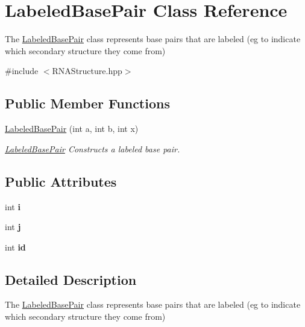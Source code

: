 \hypertarget{class_labeled_base_pair}{}\section{Labeled\+Base\+Pair Class Reference}
\label{class_labeled_base_pair}


The \hyperlink{class_labeled_base_pair}{Labeled\+Base\+Pair} class represents base pairs that are labeled (eg to indicate which secondary structure they come from)  




{\ttfamily \#include $<$R\+N\+A\+Structure.\+hpp$>$}

\subsection*{Public Member Functions}
\begin{DoxyCompactItemize}
\item 
\hyperlink{class_labeled_base_pair_a27c5707963ace24bde215692956217c4}{Labeled\+Base\+Pair} (int a, int b, int x)
\begin{DoxyCompactList}\small\item\em \hyperlink{class_labeled_base_pair}{Labeled\+Base\+Pair} Constructs a labeled base pair. \end{DoxyCompactList}\end{DoxyCompactItemize}
\subsection*{Public Attributes}
\begin{DoxyCompactItemize}
\item 
\mbox{\label{class_labeled_base_pair_a56b52985540e7152a2b77462fbfc9657}} 
int {\bfseries i}
\item 
\mbox{\label{class_labeled_base_pair_a96faa3135d81693f5da04ff89f93286c}} 
int {\bfseries j}
\item 
\mbox{\label{class_labeled_base_pair_a3bcd9b4b6ab732c36c97f10da3fa07f6}} 
int {\bfseries id}
\end{DoxyCompactItemize}


\subsection{Detailed Description}
The \hyperlink{class_labeled_base_pair}{Labeled\+Base\+Pair} class represents base pairs that are labeled (eg to indicate which secondary structure they come from) 

